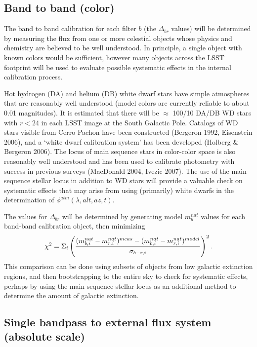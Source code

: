 \documentclass[12pt,preprint]{aastex}
\begin{document}
\subsection{Band to band (color)}

The band to band calibration for each filter $b$ (the $\Delta_{br}$
values) will be determined by measuring the flux from one or more
celestial objects whose physics and chemistry are believed to be well
understood. In principle, a single object with known colors would be
sufficient, however many objects across the LSST footprint
will be used to evaluate possible systematic effects in the internal
calibration process. 

Hot hydrogen (DA) and helium (DB) white dwarf stars have simple
atmospheres that are reasonably well understood (model colors are
currently reliable to about 0.01 magnitudes). It is estimated that
there will be $\approx$ 100/10 DA/DB WD stars with $r<24$ in each LSST
image at the South Galactic Pole. Catalogs of WD stars visible from
Cerro Pachon have been constructed (Bergeron 1992, Eisenstein
2006), and a `white dwarf calibration system' has been developed
(Holberg \& Bergeron 2006). The locus of main sequence stars in
color-color space is also reasonably well understood and has been used
to calibrate photometry with success in previous surveys (MacDonald
2004, Ivezic 2007). The use of the main sequence stellar locus in addition to
WD stars will provide a valuable check on systematic effects that may
arise from using (primarily) white dwarfs in the determination of
$\phi^{atm}(\lambda,alt,az,t)$. 

The values for $\Delta_{br}$ will be determined by generating model
$m_b^{nat}$ values for each band-band calibration object, then
minimizing 
\begin{equation}
\chi^2 = \Sigma_{i} \left( { (m_{b,i}^{nat} - m_{r,i}^{nat})^{meas} - (m_{b,i}^{nat}
    - m_{r,i}^{nat})^{model} \over  \sigma_{b-r,i}}\right) ^2. 
\end{equation}
This comparison can
be done using subsets of objects from low galactic extinction regions,
and then bootstrapping to the entire sky to check for systematic
effects, perhaps by using the main sequence stellar locus as an
additional method to determine the amount of galactic extinction. 

\subsection{Single bandpass to external flux system (absolute scale)}
\end{document}
